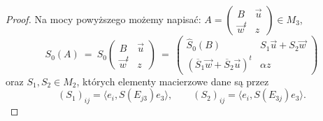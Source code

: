 \begin{proof}
Na mocy powyższego możemy napisać:
$A  =   \left( \begin{smallmatrix}
    B & \vec{u} \\
    \vec{w}^{t} & z
    \end{smallmatrix} \right) \in M_{3}$,
\begin{equation}
    S_{0}(A) \:=\: S_{0} \begin{pmatrix}
    B & \vec{u} \\
    \vec{w}^{t} & z
    \end{pmatrix} \: = \:
    \begin{pmatrix}
        \hat{S}_{0}(B) & S_{1} \vec{u} + S_{2} \vec{w} \\
        (\overline{S}_{1} \vec{w} + \overline{S}_{2} \vec{u})^{t} & \alpha z
    \end{pmatrix}
\end{equation}
oraz  $S_{1}, S_{2} \in M_{2}$, których elementy macierzowe dane są przez
\begin{equation}
(S_{1})_{ij} = \langle e_{i}, S(E_{j3}) e_{3} \rangle, \quad \quad
(S_{2})_{ij} = \langle e_{i}, S(E_{3j}) e_{3} \rangle.
\end{equation}


\end{proof}
